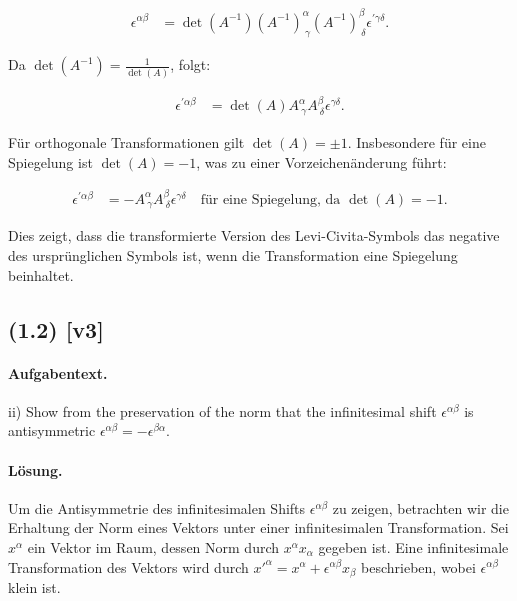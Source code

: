 \documentclass[11pt,a4paper]{article}
\begin{document}
\begin{align*}
\epsilon^{\alpha \beta} &= \det(A^{-1}) (A^{-1})^\alpha_{\ \gamma} (A^{-1})^\beta_{\ \delta} \epsilon^{\prime \gamma \delta}.
\end{align*}

Da $\det(A^{-1}) = \frac{1}{\det(A)}$, folgt:

\begin{align*}
\epsilon^{\prime \alpha \beta} &= \det(A) A^\alpha_{\ \gamma} A^\beta_{\ \delta} \epsilon^{\gamma \delta}.
\end{align*}

Für orthogonale Transformationen gilt $\det(A) = \pm 1$. Insbesondere für eine Spiegelung ist $\det(A) = -1$, was zu einer Vorzeichenänderung führt:

\begin{align*}
\epsilon^{\prime \alpha \beta} &= - A^\alpha_{\ \gamma} A^\beta_{\ \delta} \epsilon^{\gamma \delta} \quad \text{für eine Spiegelung, da } \det(A) = -1.
\end{align*}

Dies zeigt, dass die transformierte Version des Levi-Civita-Symbols das negative des ursprünglichen Symbols ist, wenn die Transformation eine Spiegelung beinhaltet.


\subsection*{(1.2) [v3]}
\paragraph{Aufgabentext.}
ii) Show from the preservation of the norm that the infinitesimal shift $\epsilon^{\alpha \beta}$ is antisymmetric $\epsilon^{\alpha \beta}=-\epsilon^{\beta \alpha}$.

\paragraph{Lösung.}
Um die Antisymmetrie des infinitesimalen Shifts $\epsilon^{\alpha \beta}$ zu zeigen, betrachten wir die Erhaltung der Norm eines Vektors unter einer infinitesimalen Transformation. Sei $x^\alpha$ ein Vektor im Raum, dessen Norm durch $x^\alpha x_\alpha$ gegeben ist. Eine infinitesimale Transformation des Vektors wird durch $x'^\alpha = x^\alpha + \epsilon^{\alpha \beta} x_\beta$ beschrieben, wobei $\epsilon^{\alpha \beta}$ klein ist.
\end{document}
